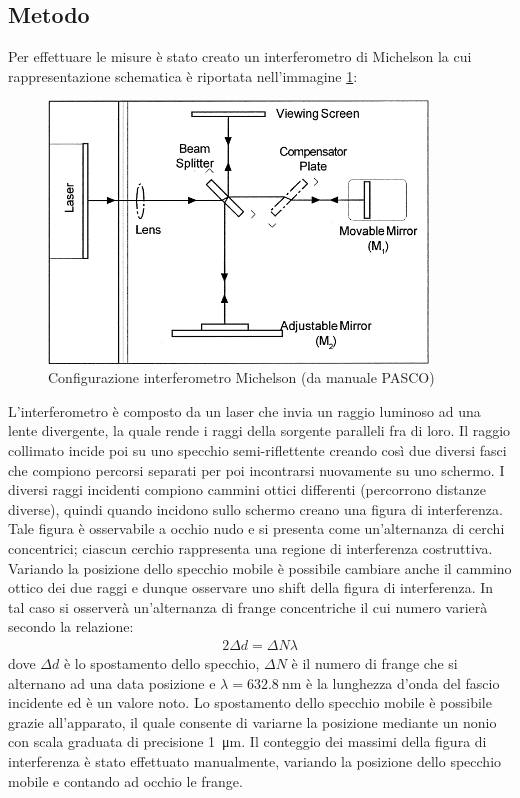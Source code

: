 \documentclass[a4paper]{article}
\begin{document}
\subsection{Metodo}
Per effettuare le misure è stato creato un interferometro di Michelson la cui rappresentazione schematica è riportata nell'immagine \ref{fig:configurazione-michelson}:
\begin{figure}[htbp]
\centering
\includegraphics[width=0.9\textwidth]{grafici/configurazione michaelson.png}
\caption{Configurazione interferometro Michelson (da manuale PASCO)}
\label{fig:configurazione-michelson}
\end{figure}
L'interferometro è composto da un laser che invia un raggio luminoso ad una lente divergente, la quale rende i raggi della sorgente paralleli fra di loro. Il raggio collimato incide poi su uno specchio semi-riflettente creando così due diversi fasci che compiono percorsi separati per poi incontrarsi nuovamente su uno schermo. I diversi raggi incidenti compiono cammini ottici differenti (percorrono distanze diverse), quindi quando incidono sullo schermo creano una figura di interferenza. Tale figura è osservabile a occhio nudo e si presenta come un'alternanza di cerchi concentrici; ciascun cerchio rappresenta una regione di interferenza costruttiva. Variando la posizione dello specchio mobile è possibile cambiare anche il cammino ottico dei due raggi e dunque osservare uno shift della figura di interferenza. In tal caso si osserverà un'alternanza di frange concentriche il cui numero varierà secondo la relazione: 
\begin{align}
    2 \Delta d=\Delta N \lambda
\label{eq:michelson-calibrazione}
\end{align}
dove $\Delta d$ è lo spostamento dello specchio, $\Delta N$ è il numero di frange che si alternano ad una data posizione e $\lambda=\SI{632.8}{\nano\meter}$ è la lunghezza d'onda del fascio incidente ed è un valore noto. Lo spostamento dello specchio mobile è possibile grazie all'apparato, il quale consente di variarne la posizione mediante un nonio con scala graduata di precisione \SI{1}{\micro\meter}. Il conteggio dei massimi della figura di interferenza è stato effettuato manualmente, variando la posizione dello specchio mobile e contando ad occhio le frange.
\end{document}
